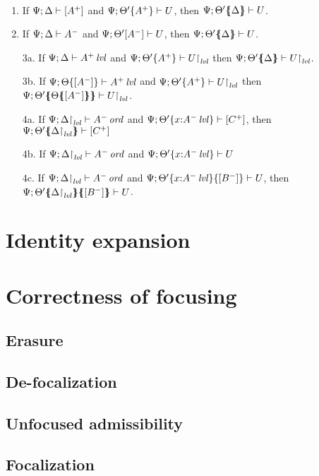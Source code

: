 \bigskip
\bigskip
\bigskip

\begin{theorem}~
\begin{enumerate}
\item If ${\Psi};{\Delta} \vdash {[ A^+ ]}$
      and ${\Psi};{{\Theta'}\{{A^+}\}} \vdash {U}$, 
      then ${\Psi};{{\Theta'}\mbox{$\{\hspace{-4pt}\{$}{{\Delta}}\mbox{$\}\hspace{-4pt}\}$}} \vdash {U}$.
\item If ${\Psi};{\Delta} \vdash {A^-}$ 
      and ${\Psi};{\Theta'}[{A^-}] \vdash {U}$, 
      then ${\Psi};{{\Theta'}\mbox{$\{\hspace{-4pt}\{$}{\Delta}\mbox{$\}\hspace{-4pt}\}$}} \vdash {U}$.
\item[3a.] 
      If ${\Psi};{\Delta} \vdash {{A^+}\,{{\it lvl}}}$
      and ${\Psi};{{\Theta'}\{{A^+}\}} \vdash {\ensuremath{{U}{\upharpoonright}_{{\it lvl}}}}$
      then ${\Psi};{{\Theta'}\mbox{$\{\hspace{-4pt}\{$}{\Delta}\mbox{$\}\hspace{-4pt}\}$}} \vdash {\ensuremath{{U}{\upharpoonright}_{{\it lvl}}}}$.
\item[3b.] 
      If ${\Psi};{{\Theta}\{{[A^-]}\}} \vdash {{A^+}\,{{\it lvl}}}$
      and ${\Psi};{{\Theta'}\{{A^+}\}} \vdash {\ensuremath{{U}{\upharpoonright}_{{\it lvl}}}}$
      then ${\Psi};{{\Theta'}\mbox{$\{\hspace{-4pt}\{$}{{\Theta}\mbox{$\{\hspace{-4pt}\{$}{[A^-]}\mbox{$\}\hspace{-4pt}\}$}}\mbox{$\}\hspace{-4pt}\}$}} \vdash {\ensuremath{{U}{\upharpoonright}_{{\it lvl}}}}$.
\item[4a.]
      If ${\Psi};{{\Delta}{\upharpoonright}_{{\it lvl}}} \vdash {{A^-}\,{{\it ord}}}$
      and ${\Psi};{{\Theta'}\{{x{:}{A^-}\,{{\it lvl}}}\}} \vdash [{C^+}]$,
      then ${\Psi};{{\Theta'}\mbox{$\{\hspace{-4pt}\{$}{\ensuremath{{\Delta}{\upharpoonright}_{{\it lvl}}}}\mbox{$\}\hspace{-4pt}\}$}} \vdash [{C^+}]$
\item[4b.]
      If ${\Psi};{{\Delta}{\upharpoonright}_{{\it lvl}}} \vdash {{A^-}\,{{\it ord}}}$
      and ${\Psi};{{\Theta'}\{{x{:}{A^-}\,{{\it lvl}}}\}} \vdash {U}$
\item[4c.]
      If ${\Psi};{{\Delta}{\upharpoonright}_{{\it lvl}}} \vdash {{A^-}\,{{\it ord}}}$
      and ${\Psi};{{{\Theta'}\{{x{:}{A^-}\,{{\it lvl}}}\}}\{{[B^-]}\}} \vdash {U}$,
      then ${\Psi};{{{\Theta'}\mbox{$\{\hspace{-4pt}\{$}{\ensuremath{{\Delta}{\upharpoonright}_{{\it lvl}}}}\mbox{$\}\hspace{-4pt}\}$}}\mbox{$\{\hspace{-4pt}\{$}{[B^-]}\mbox{$\}\hspace{-4pt}\}$}} \vdash {U}$.
\end{enumerate}
\end{theorem}

\section{Identity expansion}
\label{sec:ord-identity}

\section{Correctness of focusing}
\label{sec:ord-correctness}

\subsection{Erasure}

\subsection{De-focalization}

\subsection{Unfocused admissibility}

\subsection{Focalization}



